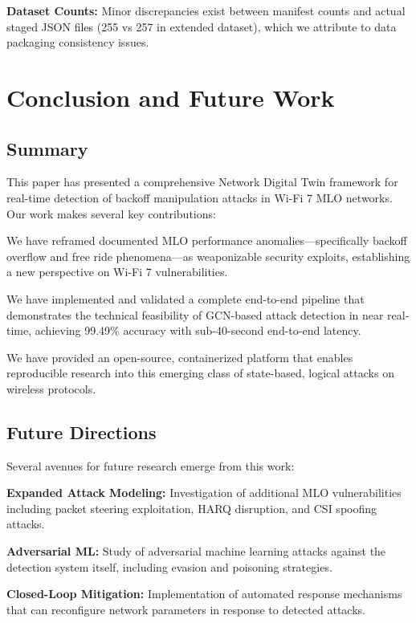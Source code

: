 \documentclass[conference]{IEEEtran}
\begin{document}
\textbf{Dataset Counts:} Minor discrepancies exist between manifest counts and actual staged JSON files (255 vs 257 in extended dataset), which we attribute to data packaging consistency issues.

\section{Conclusion and Future Work}
\label{sec:conclusion}

\subsection{Summary}

This paper has presented a comprehensive Network Digital Twin framework for real-time detection of backoff manipulation attacks in Wi-Fi 7 MLO networks. Our work makes several key contributions:

We have reframed documented MLO performance anomalies---specifically backoff overflow and free ride phenomena---as weaponizable security exploits, establishing a new perspective on Wi-Fi 7 vulnerabilities.

We have implemented and validated a complete end-to-end pipeline that demonstrates the technical feasibility of GCN-based attack detection in near real-time, achieving 99.49\% accuracy with sub-40-second end-to-end latency.

We have provided an open-source, containerized platform that enables reproducible research into this emerging class of state-based, logical attacks on wireless protocols.

\subsection{Future Directions}

Several avenues for future research emerge from this work:

\textbf{Expanded Attack Modeling:} Investigation of additional MLO vulnerabilities including packet steering exploitation, HARQ disruption, and CSI spoofing attacks.

\textbf{Adversarial ML:} Study of adversarial machine learning attacks against the detection system itself, including evasion and poisoning strategies.

\textbf{Closed-Loop Mitigation:} Implementation of automated response mechanisms that can reconfigure network parameters in response to detected attacks.
\end{document}
